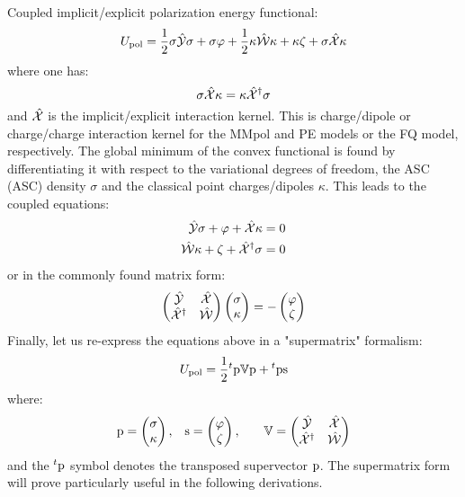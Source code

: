 Coupled implicit/explicit polarization energy functional:
\begin{equation}\label{eq:pcm-mm-functional}
  U_\mathrm{pol} =
   \frac{1}{2}\sigma\hat{\mathcal{Y}}\sigma + \sigma\varphi
 + \frac{1}{2}\kappa\hat{\mathcal{W}}\kappa + \kappa\zeta
 + \sigma\hat{\mathcal{X}}\kappa
\end{equation}
where one has:
\begin{equation}
  \sigma\hat{\mathcal{X}}\kappa = \kappa\hat{\mathcal{X}}^\dagger\sigma
\end{equation}
and $\hat{\mathcal{X}}$ is the implicit/explicit interaction kernel. This is
charge/dipole or charge/charge interaction kernel for the MMpol and PE models
or the FQ model, respectively.
The global minimum of the convex functional is found by differentiating
it with respect to the variational degrees of freedom, \ie{} the
\acl{ASC} (\acs{ASC}) density $\sigma$ and the classical point
charges/dipoles $\kappa$. This leads to the coupled equations:
\begin{align}
  \hat{\mathcal{Y}}\sigma + \varphi + \hat{\mathcal{X}}\kappa &= 0 \\
  \hat{\mathcal{W}}\kappa  + \zeta + \hat{\mathcal{X}}^\dagger\sigma &= 0
\end{align}
or in the commonly found matrix form:
\begin{equation}
  \begin{pmatrix}
    \hat{\mathcal{Y}} & \hat{\mathcal{X}} \\
    \hat{\mathcal{X}}^\dagger & \hat{\mathcal{W}}
  \end{pmatrix}
  \begin{pmatrix}
   \sigma \\
   \kappa
  \end{pmatrix}
  =
  -
  \begin{pmatrix}
   \varphi \\
   \zeta
  \end{pmatrix}
\end{equation}
Finally, let us re-express the equations above in a "supermatrix"
formalism:
\begin{equation}
  U_\mathrm{pol} =
  \frac{1}{2}{}^t\mathrm{p}\mathbb{V}\mathrm{p} + {}^t\mathrm{p}\mathrm{s}
\end{equation}
where:
\begin{alignat}{3}
  \mathrm{p} =
  \begin{pmatrix}
    \sigma \\
    \kappa
  \end{pmatrix},
  \quad&
  \mathrm{s} =
  \begin{pmatrix}
   \varphi \\
   \zeta
  \end{pmatrix},
  \quad&
  \mathbb{V} =
  \begin{pmatrix}
    \hat{\mathcal{Y}} & \hat{\mathcal{X}} \\
    \hat{\mathcal{X}}^\dagger & \hat{\mathcal{W}}
  \end{pmatrix}
\end{alignat}
and the ${}^t\mathrm{p}$ symbol denotes the transposed supervector $\mathrm{p}$.
The supermatrix form will prove particularly useful in the following
derivations.

